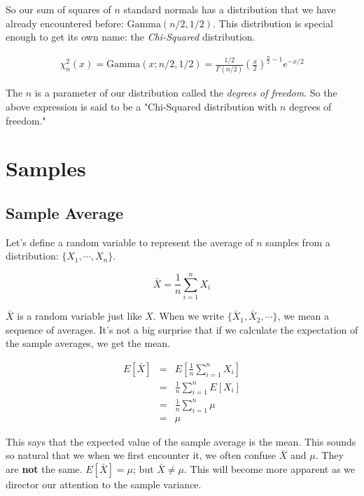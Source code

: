\documentclass[]{article}
\begin{document}
So our sum of squares of $n$ standard normals has a distribution
that we have already encountered before: $\mbox{Gamma}(n/2, 1/2)$.
This distribution is special enough to get its own name:
the \emph{Chi-Squared} distribution.

\begin{eqnarray} \label{chisq_density}
\chi_n^2(x) = \mbox{Gamma}(x; n/2, 1/2) = \frac{1/2}{\Gamma(n/2)} 
     \left( \frac{x}{2} \right)^{\frac{n}{2}-1} e^{- x/2}
\end{eqnarray}

The $n$ is a parameter of our distribution called the
\emph{degrees of freedom}.  So the above expression is
said to be a 
"Chi-Squared distribution with $n$ degrees of freedom."


\section{Samples}

\subsection{Sample Average}

Let's define a random variable to represent the average of
$n$ samples from a distribution: $\{X_1, \cdots , X_n\}$.

\begin{equation}
\bar{X} = \frac{1}{n} \sum_{i=1}^n X_i
\end{equation}

$\bar{X}$ is a random variable just like $X$.  When we
write $\{\bar{X}_1, \bar{X}_2, \cdots\}$, we mean a sequence
of averages.  It's not a big surprise that if we calculate the
expectation of the sample averages, we get the mean.

\begin{eqnarray*}
E[\bar{X}] &= & E \left[ \frac{1}{n} \sum_{i=1}^n X_i \right] \\
  &= & \frac{1}{n} \sum_{i=1}^n E \left[ X_i \right] \\
  &= & \frac{1}{n} \sum_{i=1}^n \mu \\
  &= & \mu 
\end{eqnarray*}

This says that the expected value of the sample average is
the mean.  This sounds so natural that we when we first
encounter it, we often confuse $\bar{X}$ and $\mu$.  They
are \textbf{not} the same.  $E[\bar{X}] = \mu$; but
$\bar{X} \ne \mu$.  This will become more apparent as we
director our attention to the sample variance.
\end{document}
